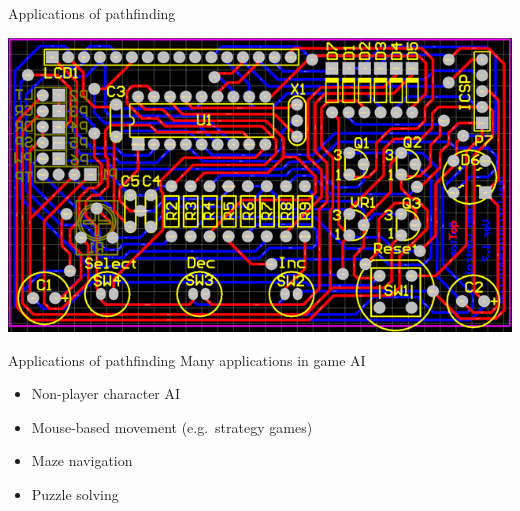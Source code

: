 \begin{frame}{Applications of pathfinding}
    \begin{center}
        \includegraphics[width=\textwidth]{pcb}
    \end{center}
\end{frame}

\begin{frame}{Applications of pathfinding}
    Many applications in game AI \pause
    \begin{itemize}
        \item Non-player character AI \pause
        \item Mouse-based movement (e.g.\ strategy games) \pause
        \item Maze navigation \pause
        \item Puzzle solving
    \end{itemize}
\end{frame}

